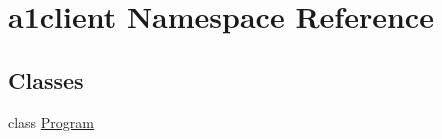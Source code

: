 \hypertarget{namespacea1client}{}\section{a1client Namespace Reference}
\label{namespacea1client}
\subsection*{Classes}
\begin{DoxyCompactItemize}
\item 
class \mbox{\hyperlink{classa1client_1_1_program}{Program}}
\end{DoxyCompactItemize}
